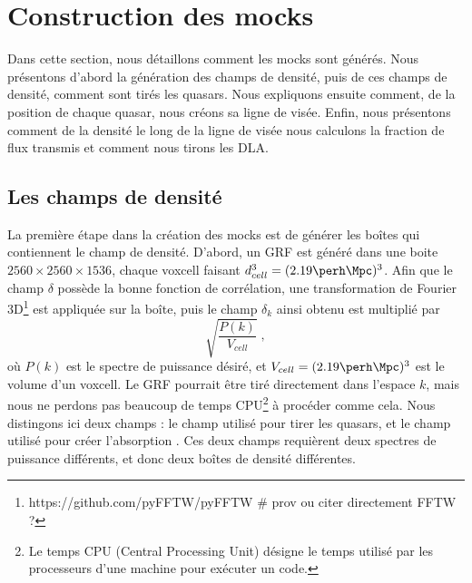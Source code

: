 \documentclass[11pt, twoside, a4paper, openright]{report}
\begin{document}
\section{Construction des mocks}
Dans cette section, nous détaillons comment les mocks sont générés. Nous présentons d'abord la génération des champs de densité, puis de ces champs de densité, comment sont tirés les quasars. Nous expliquons ensuite comment, de la position de chaque quasar, nous créons sa ligne de visée. Enfin, nous présentons comment de la densité le long de la ligne de visée nous calculons la fraction de flux transmis et comment nous tirons les DLA.


\subsection{Les champs de densité}
La première étape dans la création des mocks est de générer les boîtes qui contiennent le champ de densité. D'abord, un GRF est généré dans une boite $\num{2560}\times\num{2560}\times\num{1536}$, chaque voxcell faisant  $d_{cell}^3 = (\num{2.19} \si{\perh\Mpc})^3$.
Afin que le champ $\delta$ possède la bonne fonction de corrélation, une transformation de Fourier 3D\footnote{https://github.com/pyFFTW/pyFFTW \# prov ou citer directement FFTW ?} est appliquée sur la boîte, puis le champ $\delta_k$ ainsi obtenu est multiplié par
\begin{equation}
  \sqrt{\frac{P(k)}{V_{cell}}} \; ,
\end{equation}
où $P(k)$ est le spectre de puissance désiré, et $V_{cell} = (\num{2.19} \si{\perh\Mpc})^3$ est le volume d'un voxcell.
Le GRF pourrait être tiré directement dans l'espace $k$, mais nous ne perdons pas beaucoup de temps CPU\footnote{Le temps CPU (Central Processing Unit) désigne le temps utilisé par les processeurs d'une machine pour exécuter un code.} à procéder comme cela.
Nous distingons ici deux champs : le champ utilisé pour tirer les quasars, et le champ utilisé pour créer l'absorption \lya{}. Ces deux champs requièrent deux spectres de puissance différents, et donc deux boîtes de densité différentes.
\end{document}
